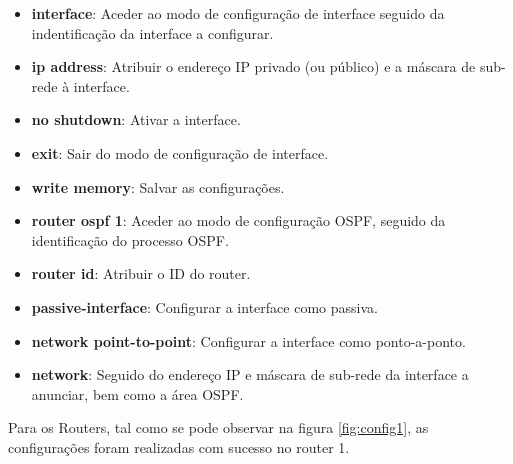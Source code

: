 \documentclass[11pt,english, openright, oneside]{book}
\begin{document}
\begin{itemize}
  \item \textbf{interface}: Aceder ao modo de configuração de interface seguido da indentificação da interface a configurar.
  \item \textbf{ip address}: Atribuir o endereço IP privado (ou público) e a máscara de sub-rede à interface.
  \item \textbf{no shutdown}: Ativar a interface.
  \item \textbf{exit}: Sair do modo de configuração de interface.
  \item \textbf{write memory}: Salvar as configurações. 
  \item \textbf{router ospf 1}: Aceder ao modo de configuração OSPF, seguido da identificação do processo OSPF.
  \item \textbf{router id}: Atribuir o ID do router.
  \item \textbf{passive-interface}: Configurar a interface como passiva.
  \item \textbf{network point-to-point}: Configurar a interface como ponto-a-ponto.
  \item \textbf{network}: Seguido do endereço IP e máscara de sub-rede da interface a anunciar, bem como a área OSPF.
\end{itemize}
\vspace{0.2cm}

\newpage
Para os Routers, tal como se pode observar na figura \ref{fig:config1}, as configurações foram realizadas com sucesso no router 1.
\vspace{0.2cm}
\end{document}
